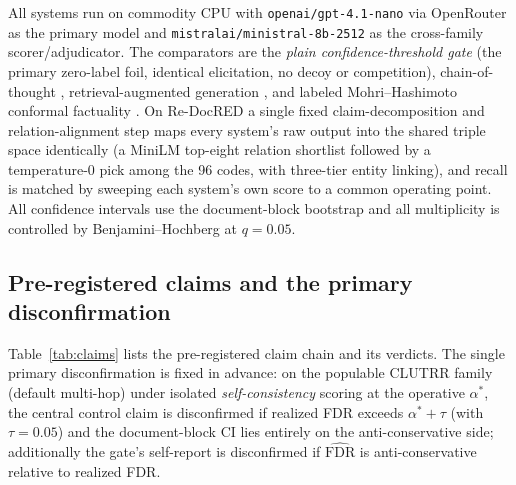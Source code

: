 \documentclass[11pt,letterpaper]{article}
\begin{document}
All systems run on commodity CPU with \texttt{openai/gpt-4.1-nano} via OpenRouter as the primary model and \texttt{mistralai/ministral-8b-2512} as the cross-family scorer/adjudicator. The comparators are the \emph{plain confidence-threshold gate} (the primary zero-label foil, identical elicitation, no decoy or competition), chain-of-thought \cite{Wei2022}, retrieval-augmented generation \cite{Lewis2020}, and labeled Mohri--Hashimoto conformal factuality \cite{Mohri2024}. On Re-DocRED a single fixed claim-decomposition and relation-alignment step maps every system's raw output into the shared triple space identically (a MiniLM \cite{Reimers2019} top-eight relation shortlist followed by a temperature-0 pick among the 96 codes, with three-tier entity linking), and recall is matched by sweeping each system's own score to a common operating point. All confidence intervals use the document-block bootstrap and all multiplicity is controlled by Benjamini--Hochberg at $q = 0.05$.

\subsection{Pre-registered claims and the primary disconfirmation}

Table~\ref{tab:claims} lists the pre-registered claim chain and its verdicts. The single primary disconfirmation is fixed in advance: on the populable CLUTRR family (default multi-hop) under isolated \emph{self-consistency} scoring at the operative $\alpha^{*}$, the central control claim is disconfirmed if realized FDR exceeds $\alpha^{*}+\tau$ (with $\tau=0.05$) and the document-block CI lies entirely on the anti-conservative side; additionally the gate's self-report is disconfirmed if $\widehat{\mathrm{FDR}}$ is anti-conservative relative to realized FDR.
\end{document}

